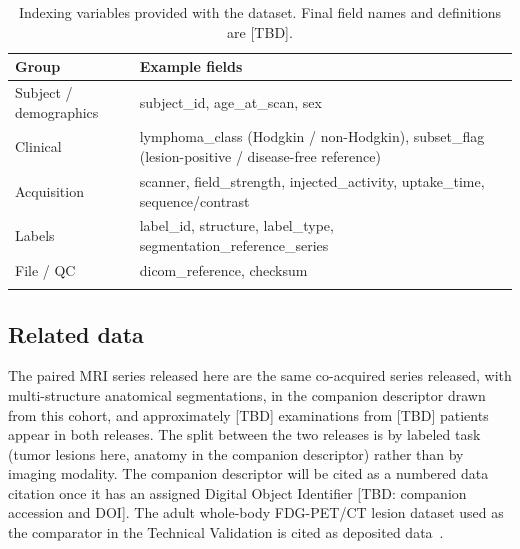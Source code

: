 \begin{table}[h]
\caption{Indexing variables provided with the dataset. Final field names and definitions are [TBD].}\label{tab:vars}
\begin{tabular}{@{}ll@{}}
\toprule
Group & Example fields \\
\midrule
Subject / demographics & subject\_id, age\_at\_scan, sex \\
Clinical               & lymphoma\_class (Hodgkin / non-Hodgkin), subset\_flag (lesion-positive / disease-free reference) \\
Acquisition            & scanner, field\_strength, injected\_activity, uptake\_time, sequence/contrast \\
Labels                 & label\_id, structure, label\_type, segmentation\_reference\_series \\
File / QC              & dicom\_reference, checksum \\
\botrule
\end{tabular}
\end{table}

\subsection*{Related data}\label{subsec:related}
The paired MRI series released here are the same co-acquired series released, with multi-structure anatomical segmentations, in the companion descriptor drawn from this cohort, and approximately [TBD] examinations from [TBD] patients appear in both releases.
The split between the two releases is by labeled task (tumor lesions here, anatomy in the companion descriptor) rather than by imaging modality.
The companion descriptor will be cited as a numbered data citation once it has an assigned Digital Object Identifier [TBD: companion accession and DOI].
The adult whole-body FDG-PET/CT lesion dataset used as the comparator in the Technical Validation is cited as deposited data~\cite{Gatidis_2022_data}.
